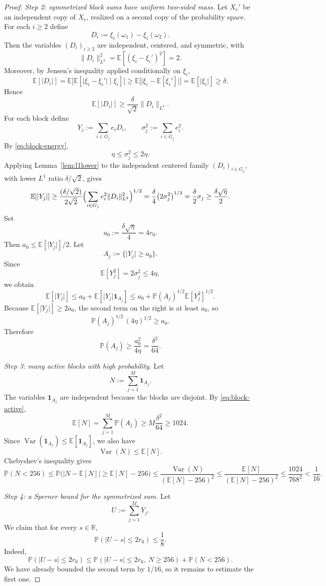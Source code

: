 \documentclass[11pt]{amsart}
\numberwithin{equation}{section}
\theoremstyle{definition}
\theoremstyle{remark}
\newcommand{\E}{\mathbb E}
\newcommand{\Prob}{\mathbb P}
\newcommand{\R}{\mathbb R}
\newcommand{\abs}[1]{\lvert #1 \rvert}
\newcommand{\norm}[1]{\lVert #1 \rVert}
\begin{document}
\begin{proof}
\smallskip
\noindent\emph{Step 2: symmetrized block sums have uniform two-sided mass.}
Let $X_e'$ be an independent copy of $X_e$, realized on a second copy of the
probability space.  For each $i\ge2$ define
\[
D_i:=\xi_i(\omega_1)-\xi_i(\omega_2).
\]
Then the variables $(D_i)_{i\ge2}$ are independent, centered, and symmetric,
with
\[
\norm{D_i}_{L^2}^2
=\E[(\xi_i-\xi_i')^2]
=2.
\]
Moreover, by Jensen's inequality applied conditionally on $\xi_i$,
\[
\E[\abs{D_i}]
=\E\bigl[\E[\abs{\xi_i-\xi_i'}\mid \xi_i]\bigr]
\ge \E\bigl[\abs{\xi_i-\E[\xi_i']} \bigr]
=\E[\abs{\xi_i}]
\ge \delta.
\]
Hence
\[
\E[\abs{D_i}]
\ge \frac{\delta}{\sqrt2}\norm{D_i}_{L^2}.
\]
For each block define
\[
Y_j:=\sum_{i\in G_j} e_iD_i,
\qquad
\sigma_j^2:=\sum_{i\in G_j} e_i^2.
\]
By \eqref{eq:block-energy},
\[
\eta\le \sigma_j^2\le 2\eta.
\]
Applying Lemma~\ref{lem:l1lower} to the independent centered family
$(D_i)_{i\in G_j}$, with lower $L^1$ ratio $\delta/\sqrt2$, gives
\[
\E[\abs{Y_j}]
\ge
\frac{(\delta/\sqrt2)}{2\sqrt2}
\Bigl(\sum_{i\in G_j} e_i^2\norm{D_i}_{L^2}^2\Bigr)^{1/2}
=\frac{\delta}{4}\bigl(2\sigma_j^2\bigr)^{1/2}
=\frac{\delta}{2}\sigma_j
\ge \frac{\delta\sqrt{\eta}}{2}.
\]
Set
\[
a_0:=\frac{\delta\sqrt{\eta}}{4}=4r_0.
\]
Then $a_0\le \E[\abs{Y_j}]/2$.  Let
\[
A_j:=\{\abs{Y_j}\ge a_0\}.
\]
Since
\[
\E[Y_j^2]=2\sigma_j^2\le 4\eta,
\]
we obtain
\[
\E[\abs{Y_j}]
\le a_0+\E[\abs{Y_j}\mathbf 1_{A_j}]
\le a_0+\Prob(A_j)^{1/2}\E[Y_j^2]^{1/2}.
\]
Because $\E[\abs{Y_j}]\ge 2a_0$, the second term on the right is at least
$a_0$, so
\[
\Prob(A_j)^{1/2}\,(4\eta)^{1/2}\ge a_0.
\]
Therefore
\begin{equation}\label{eq:block-active}
\Prob(A_j)\ge \frac{a_0^2}{4\eta}=\frac{\delta^2}{64}.
\end{equation}

\smallskip
\noindent\emph{Step 3: many active blocks with high probability.}
Let
\[
N:=\sum_{j=1}^M \mathbf 1_{A_j}.
\]
The variables $\mathbf 1_{A_j}$ are independent because the blocks are
disjoint.  By \eqref{eq:block-active},
\[
\E[N]
=\sum_{j=1}^M \Prob(A_j)
\ge M\frac{\delta^2}{64}
\ge 1024.
\]
Since $\operatorname{Var}(\mathbf 1_{A_j})\le \E[\mathbf 1_{A_j}]$, we also have
\[
\operatorname{Var}(N)\le \E[N].
\]
Chebyshev's inequality gives
\[
\Prob(N<256)
\le
\Prob\bigl(\abs{N-\E[N]}\ge \E[N]-256\bigr)
\le
\frac{\operatorname{Var}(N)}{(\E[N]-256)^2}
\le
\frac{\E[N]}{(\E[N]-256)^2}
\le \frac{1024}{768^2}
<\frac1{16}.
\]

\smallskip
\noindent\emph{Step 4: a Sperner bound for the symmetrized sum.}
Let
\[
U:=\sum_{j=1}^M Y_j.
\]
We claim that for every $s\in\R$,
\begin{equation}\label{eq:symm-smallball}
\Prob(\abs{U-s}\le 2r_0)\le \frac18.
\end{equation}
Indeed,
\[
\Prob(\abs{U-s}\le 2r_0)
\le
\Prob(\abs{U-s}\le 2r_0,\ N\ge256)+\Prob(N<256).
\]
We have already bounded the second term by $1/16$, so it remains to estimate
the first one.


\end{proof}
\end{document}
